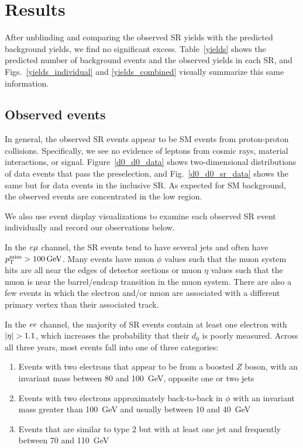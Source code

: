 \section{Results}
\label{results}
After unblinding and comparing the observed SR yields with the predicted background yields, we find no significant excess. Table~\ref{yields} shows the predicted number of background events and the observed yields in each SR, and Figs.~\ref{yields_individual} and \ref{yields_combined} visually summarize this same information. 




\subsection{Observed events}
In general, the observed SR events appear to be SM events from proton-proton collisions. Specifically, we see no evidence of leptons from cosmic rays, material interactions, or signal.  Figure~\ref{d0_d0_data} shows two-dimensional \ad distributions of data events that pass the preselection, and Fig.~\ref{d0_d0_sr_data} shows the same but for data events in the inclusive SR. As expected for SM background, the observed events are concentrated in the low \ad region.



We also use event display visualizations to examine each observed SR event individually and record our observations below.

In the $e{\mu}$ channel, the SR events tend to have several jets and often have $\ptmiss>\SI{100}{\GeV}$. Many events have muon $\phi$ values such that the muon system hits are all near the edges of detector sections or muon $\eta$ values such that the muon is near the barrel/endcap transition in the muon system. There are also a few events in which the electron and/or muon are associated with a different primary vertex than their associated track.

In the $ee$ channel, the majority of SR events contain at least one electron with $\lvert \eta \rvert > 1.1$, which increases the probability that their $d_0$ is poorly measured. Across all three years, most events fall into one of three categories: 
\begin{enumerate}
    \itemsep0em
    \item Events with two electrons that appear to be from a boosted $Z$ boson, with an invariant mass between \num{80} and \SI{100}{\GeV}, opposite one or two jets
    \item Events with two electrons approximately back-to-back in $\phi$ with an invariant mass greater than \SI{100}{\GeV} and \ptmiss usually between \num{10} and \SI{40}{\GeV}
    \item Events that are similar to type 2 but with at least one jet and frequently \ptmiss between \num{70} and \SI{110}{\GeV}
\end{enumerate}

